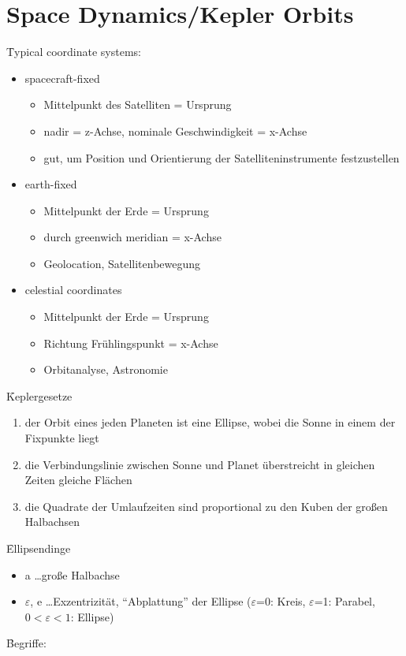 \section{Space Dynamics/Kepler Orbits}
\f{Typical coordinate systems:}
\begin{itemize}
 \item spacecraft-fixed
 \begin{itemize}
  \item Mittelpunkt des Satelliten = Ursprung
  \item nadir = z-Achse, nominale Geschwindigkeit = x-Achse
  \item gut, um Position und Orientierung der Satelliteninstrumente festzustellen
 \end{itemize}
 \item earth-fixed 
 \begin{itemize}
  \item Mittelpunkt der Erde = Ursprung
  \item durch greenwich meridian = x-Achse
  \item Geolocation, Satellitenbewegung
 \end{itemize}
 \item celestial coordinates
 \begin{itemize}
  \item Mittelpunkt der Erde = Ursprung
  \item Richtung Frühlingspunkt = x-Achse
  \item Orbitanalyse, Astronomie
 \end{itemize}
\end{itemize}
\f{Keplergesetze}
\begin{enumerate}
 \item der Orbit eines jeden Planeten ist eine Ellipse, wobei die Sonne in einem der Fixpunkte liegt
 \item die Verbindungslinie zwischen Sonne und Planet überstreicht in gleichen Zeiten gleiche Flächen 
 \item die Quadrate der Umlaufzeiten sind proportional zu den Kuben der großen Halbachsen
\end{enumerate}
\f{Ellipsendinge}
\begin{itemize}
 \item a \dots große Halbachse
 \item $\varepsilon$, e \dots Exzentrizität, ``Abplattung'' der Ellipse ($\varepsilon$=0: Kreis, $\varepsilon$=1: Parabel, $0<\varepsilon<1$: Ellipse)
\end{itemize}
\f{Begriffe: }
